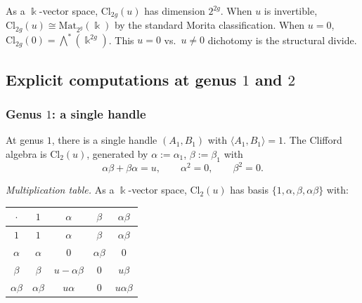 \begin{remark}
\label{rem:g9-clifford-dimension}
As a $\Bbbk$-vector space, $\mathrm{Cl}_{2g}(u)$ has dimension
$2^{2g}$. When $u$ is invertible,
$\mathrm{Cl}_{2g}(u) \cong \mathrm{Mat}_{2^g}(\Bbbk)$ by the
standard Morita classification. When $u = 0$,
$\mathrm{Cl}_{2g}(0) = \bigwedge^*(\Bbbk^{2g})$. This
$u = 0$ vs.\ $u \neq 0$ dichotomy is the structural divide.
\end{remark}

%
%

\subsection{Explicit computations at genus $1$ and $2$}
\label{subsec:g9-low-genus}

\subsubsection{Genus $1$: a single handle}
\label{subsubsec:g9-genus-1}

At genus $1$, there is a single handle $(A_1, B_1)$ with
$\langle A_1, B_1 \rangle = 1$. The Clifford algebra is
$\mathrm{Cl}_2(u)$, generated by $\alpha := \alpha_1$,
$\beta := \beta_1$ with
\begin{equation}\label{eq:g9-genus1-clifford}
\alpha\beta + \beta\alpha = u,
\qquad
\alpha^2 = 0,
\qquad
\beta^2 = 0.
\end{equation}

\emph{Multiplication table.}\;
As a $\Bbbk$-vector space, $\mathrm{Cl}_2(u)$ has basis
$\{1, \alpha, \beta, \alpha\beta\}$ with:
\begin{center}
\renewcommand{\arraystretch}{1.3}
\begin{tabular}{c|cccc}
$\cdot$ & $1$ & $\alpha$ & $\beta$ & $\alpha\beta$ \\
\hline
$1$ & $1$ & $\alpha$ & $\beta$ & $\alpha\beta$ \\
$\alpha$ & $\alpha$ & $0$ & $\alpha\beta$ & $0$ \\
$\beta$ & $\beta$ & $u - \alpha\beta$ & $0$ & $u\beta$ \\
$\alpha\beta$ & $\alpha\beta$ & $u\alpha$ & $0$ & $u\alpha\beta$
\end{tabular}
\end{center}

